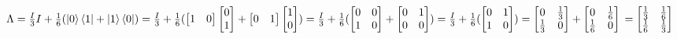 \documentclass{article}
\begin{document}
\begin{enumerate}
          $\Lambda = \frac{I}{3}I + \frac{1}{6}(\ket{0}\bra{1} + \ket{1}\bra{0})
              \\=\frac{I}{3}+\frac{1}{6}(\begin{bmatrix}
                  1 & 0 \\
              \end{bmatrix}\begin{bmatrix}
                  0 \\
                  1
              \end{bmatrix}+\begin{bmatrix}
                  0 & 1
              \end{bmatrix}\begin{bmatrix}
                  1 \\
                  0
              \end{bmatrix})
              \\=\frac{I}{3}+\frac{1}{6}(\begin{bmatrix}
                  0 & 0 \\
                  1 & 0
              \end{bmatrix}+\begin{bmatrix}
                  0 & 1 \\
                  0 & 0
              \end{bmatrix})
              \\=\frac{I}{3}+\frac{1}{6}(\begin{bmatrix}
                  0 & 1 \\
                  1 & 0
              \end{bmatrix})
              \\=\begin{bmatrix}
                  0           & \frac{1}{3} \\
                  \frac{1}{3} & 0
              \end{bmatrix}+\begin{bmatrix}
                  0           & \frac{1}{6} \\
                  \frac{1}{6} & 0
              \end{bmatrix}
              \\=\begin{bmatrix}
                  \frac{1}{3} & \frac{1}{6} \\
                  \frac{1}{6} & \frac{1}{3}
              \end{bmatrix}$



\end{enumerate}
\end{document}
